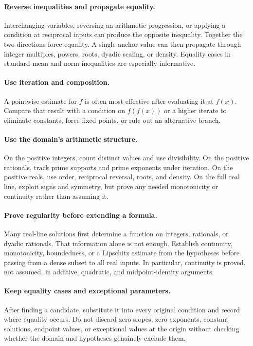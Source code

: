 \documentclass[12pt,a4paper]{article}
\begin{document}
\paragraph{Reverse inequalities and propagate equality.}
Interchanging variables, reversing an arithmetic progression, or applying a
condition at reciprocal inputs can produce the opposite inequality. Together
the two directions force equality. A single anchor value can then propagate
through integer multiples, powers, roots, dyadic scaling, or density. Equality
cases in standard mean and norm inequalities are especially informative.

\paragraph{Use iteration and composition.}
A pointwise estimate for $f$ is often most effective after evaluating it at
$f(x)$. Compare that result with a condition on $f(f(x))$ or a higher iterate
to eliminate constants, force fixed points, or rule out an alternative branch.

\paragraph{Use the domain's arithmetic structure.}
On the positive integers, count distinct values and use divisibility. On the
positive rationals, track prime supports and prime exponents under iteration.
On the positive reals, use order, reciprocal reversal, roots, and density. On
the full real line, exploit signs and symmetry, but prove any needed
monotonicity or continuity rather than assuming it.

\paragraph{Prove regularity before extending a formula.}
Many real-line solutions first determine a function on integers, rationals, or
dyadic rationals. That information alone is not enough. Establish continuity,
monotonicity, boundedness, or a Lipschitz estimate from the hypotheses before
passing from a dense subset to all real inputs. In particular, continuity is
proved, not assumed, in additive, quadratic, and midpoint-identity arguments.

\paragraph{Keep equality cases and exceptional parameters.}
After finding a candidate, substitute it into every original condition and
record where equality occurs. Do not discard zero slopes, zero exponents,
constant solutions, endpoint values, or exceptional values at the origin
without checking whether the domain and hypotheses genuinely exclude them.
\end{document}
